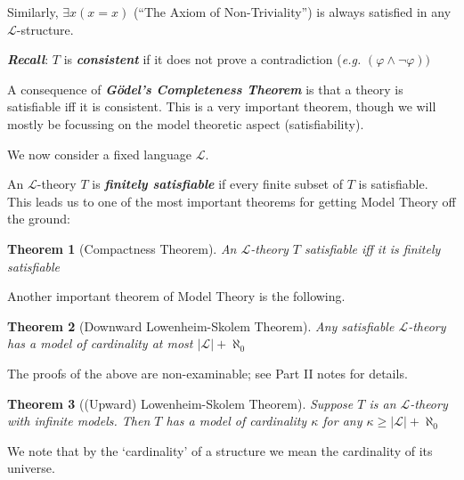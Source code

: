 \documentclass[]{article}
\theoremstyle{custhm}
\theoremstyle{cusdef}
\theoremstyle{custhm}
\theoremstyle{custhm}
\theoremstyle{custhm}
\theoremstyle{ex}
\theoremstyle{custhm}
\newtheorem*{theorem*}{Theorem}
\theoremstyle{cusdef}
\theoremstyle{remark}
\newcommand{\undf}[1]{\textit{\textbf{#1}}}
\renewcommand{\L}{\mathcal{L}}
\renewcommand{\it}[1]{\textit{#1}}
\renewcommand{\phi}{\varphi}
\renewcommand{\lnot}{\neg}
\begin{document}
Similarly, $\exists x(x=x)$ (``The Axiom of Non-Triviality'') is always satisfied in any $\L$-structure.

\undf{Recall}: $T$ is \undf{consistent} if it does not prove a contradiction (\it{e.g.} $(\phi\land\lnot\phi))$

A consequence of \undf{G{\"o}del's Completeness Theorem} is that a theory is satisfiable iff it is consistent. This is a very important theorem, though we will mostly be focussing on the model theoretic aspect (satisfiability).


We now consider a fixed language $\L$.

An $\L$-theory $T$ is \undf{finitely satisfiable} if every finite subset of $T$ is satisfiable. This leads us to one of the most important theorems for getting Model Theory off the ground:

\begin{theorem*}[Compactness Theorem]
An $\L$-theory $T$ satisfiable iff it is finitely satisfiable
\end{theorem*}

Another important theorem of Model Theory is the following.

\begin{theorem*}[Downward Lowenheim-Skolem Theorem]
	Any satisfiable $\L$-theory has a model of cardinality at most $|\L|+\aleph_0$
\end{theorem*}

The proofs of the above are non-examinable; see Part II notes for details.

\begin{theorem*}[(Upward) Lowenheim-Skolem  Theorem]
Suppose $T$ is an $\L$-theory with infinite models. Then $T$ has a model of cardinality $\kappa$ for any $\kappa \ge |\L|+\aleph_0$
\end{theorem*}

We note that by the `cardinality' of a structure we mean the cardinality of its universe.
\end{document}
